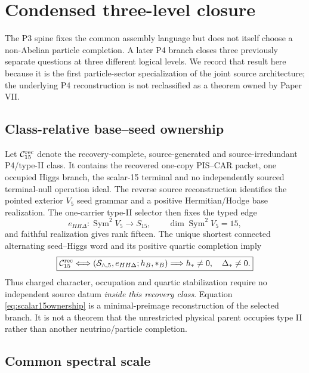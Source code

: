 \section{Condensed three-level closure}
\label{sec:scalar15handoff}

The P3 spine fixes the common assembly language but does not itself choose a
non-Abelian particle completion.  A later P4 branch closes three previously
separate questions at three different logical levels.  We record that result
here because it is the first particle-sector specialization of the joint
source architecture; the underlying P4 reconstruction is not reclassified as
a theorem owned by Paper VII.

\subsection{Class-relative base--seed ownership}

Let \(\mathcal C_{15}^{\rm rec}\) denote the recovery-complete,
source-generated and source-irredundant P4/type-II class.  It contains the
recovered one-copy PIS--CAR packet, one occupied Higgs branch, the scalar-15
terminal and no independently sourced terminal-null operation ideal.  The
reverse source reconstruction identifies the pointed exterior \(V_5\) seed
grammar and a positive Hermitian/Hodge base realization.  The one-carrier
type-II selector then fixes the typed edge
\begin{equation}
 e_{HH\Delta}:\operatorname{Sym}^2V_5\longrightarrow S_{15},
 \qquad \dim\operatorname{Sym}^2V_5=15,
 \label{eq:scalar15edge}
\end{equation}
and faithful realization gives rank fifteen.  The unique shortest connected
alternating seed--Higgs word and its positive quartic completion imply
\begin{equation}
 \boxed{
 \mathcal C_{15}^{\rm rec}
 \Longleftrightarrow
 (\mathcal S_{\wedge,5},e_{HH\Delta};h_B,*_B)
 \Longrightarrow h_*\ne0,\quad\Delta_*\ne0 .}
 \label{eq:scalar15ownership}
\end{equation}
Thus charged character, occupation and quartic stabilization require no
independent source datum \emph{inside this recovery class}.  Equation
\eqref{eq:scalar15ownership} is a minimal-preimage reconstruction of the
selected branch.  It is not a theorem that the unrestricted physical parent
occupies type II rather than another neutrino/particle completion.

\subsection{Common spectral scale}

